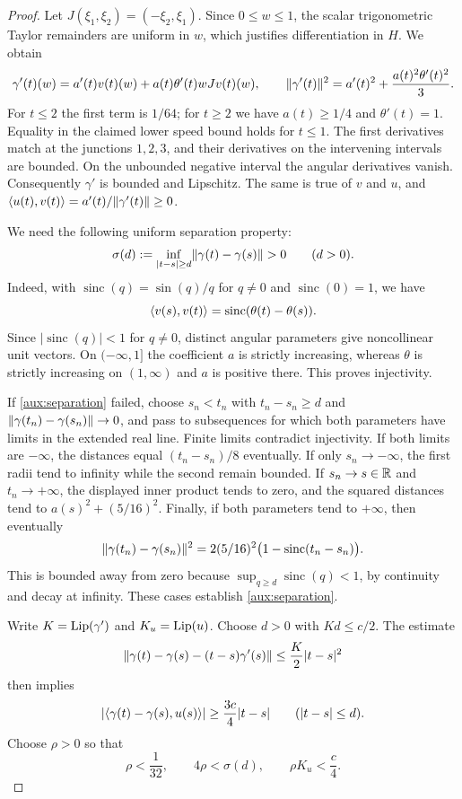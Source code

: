 \begin{proof}
Let $J(\xi_1,\xi_2)=(-\xi_2,\xi_1)$. Since $0\le w\le1$, the
scalar trigonometric Taylor remainders are uniform in $w$, which
justifies differentiation in $H$. We obtain
\[
 \gamma'(t)(w)=a'(t)v(t)(w)+a(t)\theta'(t)wJv(t)(w),
 \qquad
 \lVert \gamma'(t)\rVert^2=a'(t)^2+\frac{a(t)^2\theta'(t)^2}{3}.
\]
For $t\le2$ the first term is $1/64$; for $t\ge2$ we have
$a(t)\ge1/4$ and $\theta'(t)=1$. Equality in the claimed lower speed
bound holds for $t\le1$. The first derivatives match at the junctions
$1,2,3$, and their derivatives on the intervening intervals are bounded.
On the unbounded negative interval the angular derivatives vanish.
Consequently $\gamma'$ is bounded and Lipschitz. The same is true of
$v$ and $u$, and
$\langle u(t),v(t)\rangle=a'(t)/\lVert \gamma'(t)\rVert\ge0$.

We need the following uniform separation property:
\begin{equation}\label{aux:separation}
 \sigma(d):=\inf_{|t-s|\ge d}\lVert \gamma(t)-\gamma(s)\rVert>0
 \qquad(d>0).
\end{equation}
Indeed, with $\operatorname{sinc}(q)=\sin(q)/q$ for $q\ne0$ and
$\operatorname{sinc}(0)=1$, we have
\[
 \langle v(s),v(t)\rangle=\operatorname{sinc}(\theta(t)-\theta(s)).
\]
Since $|\operatorname{sinc}(q)|<1$ for $q\ne0$, distinct angular
parameters give noncollinear unit vectors. On $(-\infty,1]$ the
coefficient $a$ is strictly increasing, whereas $\theta$ is strictly
increasing on $(1,\infty)$ and $a$ is positive there. This proves
injectivity.

If \eqref{aux:separation} failed, choose $s_n<t_n$ with
$t_n-s_n\ge d$ and $\lVert \gamma(t_n)-\gamma(s_n)\rVert\to0$, and pass to
subsequences for which both parameters have limits in the extended real
line. Finite limits contradict injectivity. If both limits are
$-\infty$, the distances equal $(t_n-s_n)/8$ eventually. If only
$s_n\to-\infty$, the first radii tend to infinity while the second
remain bounded. If $s_n\to s\in\mathbb R$ and $t_n\to+\infty$, the displayed
inner product tends to zero, and the squared distances tend to
$a(s)^2+(5/16)^2$. Finally, if both parameters tend to $+\infty$, then
eventually
\[
 \lVert \gamma(t_n)-\gamma(s_n)\rVert^2
 =2(5/16)^2\bigl(1-\operatorname{sinc}(t_n-s_n)\bigr).
\]
This is bounded away from zero because
$\sup_{q\ge d}\operatorname{sinc}(q)<1$, by continuity and decay at
infinity. These cases establish \eqref{aux:separation}.

Write $K=\operatorname{Lip}(\gamma')$ and $K_u=\operatorname{Lip}(u)$. Choose $d>0$ with
$Kd\le c/2$. The estimate
\[
 \lVert \gamma(t)-\gamma(s)-(t-s)\gamma'(s)\rVert
 \le\frac K2|t-s|^2
\]
then implies
\begin{equation}\label{aux:tangent}
 |\langle \gamma(t)-\gamma(s),u(s)\rangle|
 \ge\frac{3c}{4}|t-s|
 \qquad(|t-s|\le d).
\end{equation}
Choose $\rho>0$ so that
\begin{equation}\label{aux:radius}
 \rho<\frac1{32},\qquad 4\rho<\sigma(d),\qquad \rho K_u<\frac c4.
\end{equation}


\end{proof}
